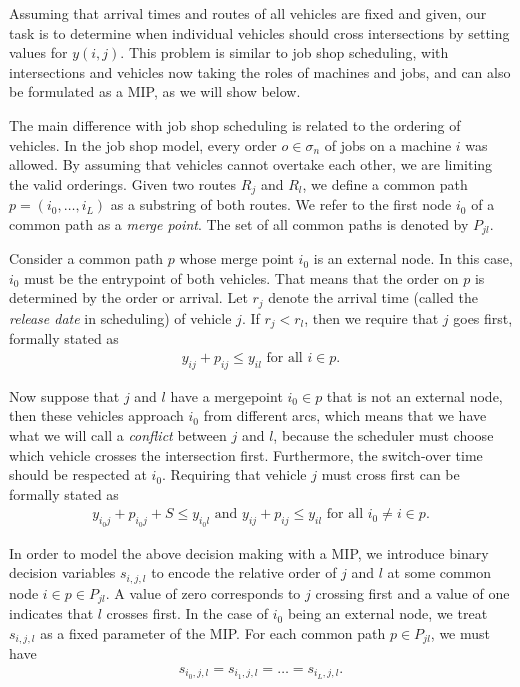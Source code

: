 \documentclass{article}
\begin{document}
Assuming that arrival times and routes of all vehicles are fixed and given, our
task is to determine when individual vehicles should cross intersections by
setting values for $y(i,j)$. This problem is similar to job shop scheduling,
with intersections and vehicles now taking the roles of machines and jobs, and
can also be formulated as a MIP, as we will show below.

The main difference with job shop scheduling is related to the ordering of
vehicles. In the job shop model, every order $o \in \sigma_{n}$ of jobs on a
machine $i$ was allowed. By assuming that vehicles cannot overtake each other,
we are limiting the valid orderings.
Given two routes $R_{j}$ and $R_{l}$, we define a common path
$p=(i_{0},\dots,i_{L})$ as a substring of both routes. We refer to the first
node $i_{0}$ of a common path as a \textit{merge point}. The set of all common
paths is denoted by $P_{jl}$.

Consider a common path $p$ whose merge point $i_{0}$ is an external node.
In this case, $i_{0}$ must be the entrypoint of both vehicles.
That means that the order on $p$ is determined by the order or arrival.
Let $r_{j}$ denote the arrival time (called the \textit{release date} in
scheduling) of vehicle $j$.
If $r_{j} < r_{l}$, then we require that $j$ goes first, formally stated as
\begin{align*}
  y_{ij} + p_{ij} \leq y_{il} \text{ for all } i \in p.
\end{align*}

Now suppose that $j$ and $l$ have a mergepoint $i_{0} \in p$ that is not an
external node, then these vehicles approach $i_{0}$ from different arcs,
which means that we have what we will call a \textit{conflict} between $j$ and
$l$, because the scheduler must choose which vehicle crosses the intersection
first. Furthermore, the switch-over time should be respected at $i_{0}$.
Requiring that vehicle $j$ must cross first can be formally stated as
\begin{align*}
  y_{i_{0}j} + p_{i_{0}j} + S \leq y_{i_{0}l} \text{ and } y_{ij} + p_{ij} \leq y_{il} \text{ for all } i_{0} \neq i \in p .
\end{align*}

In order to model the above decision making with a MIP, we introduce binary
decision variables $s_{i,j,l}$ to encode the relative order of $j$ and $l$ at some common
node $i \in p \in P_{jl}$. A value of zero corresponds to $j$ crossing first and
a value of one indicates that $l$ crosses first.
In the case of $i_{0}$ being an external node, we treat $s_{i,j,l}$ as a fixed
parameter of the MIP.
For each common path $p \in P_{jl}$, we must have
\begin{align*}
s_{i_{0},j,l} = s_{i_{1},j,l} = \dots = s_{i_{L},j,l}.
\end{align*}
\end{document}
